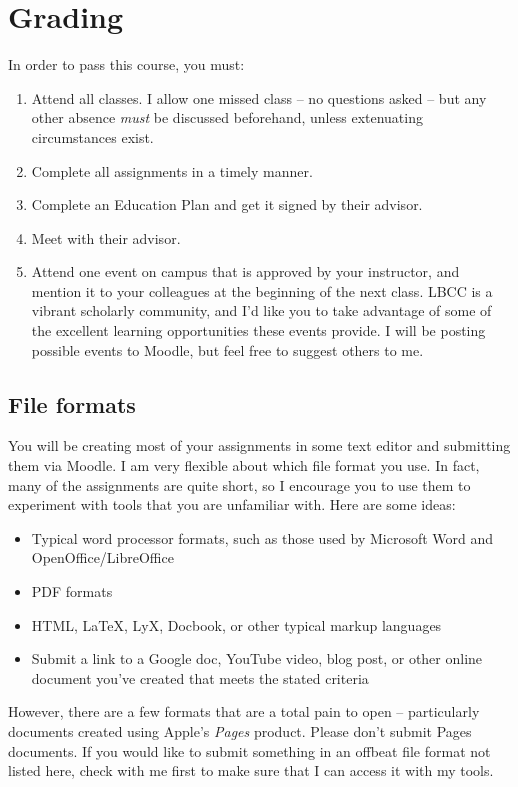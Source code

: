 \documentclass[12pt,article,oneside]{memoir}
\begin{document}
\section{Grading}

In order to pass this course, you must:

\begin{enumerate}
 \item Attend all classes.  I allow one missed class -- no questions asked -- but any other absence \emph{must} be discussed beforehand, unless extenuating circumstances exist.
 \item Complete all assignments in a timely manner.
 \item Complete an Education Plan and get it signed by their advisor.
 \item Meet with their advisor.
 \item Attend one event on campus that is approved by your instructor, and mention it to your colleagues at the beginning of the next class.  LBCC is a vibrant scholarly community, and I'd like you to take advantage of some of the excellent learning opportunities these events provide.  I will be posting possible events to Moodle, but feel free to suggest others to me.
\end{enumerate}

  
\subsection{File formats}
You will be creating most of your assignments in some text editor and submitting them via Moodle.  I am very flexible about which file format you use. In fact, many of the assignments are quite short, so I encourage you to use them to experiment with tools that you are unfamiliar with.  Here are some ideas:
\begin{itemize}
 \item Typical word processor formats, such as those used by Microsoft Word and OpenOffice/LibreOffice
 \item PDF formats
 \item HTML, \LaTeX, LyX,  Docbook, or other typical markup languages
 \item Submit a link to a Google doc, YouTube video, blog post, or other online document you've created that meets the stated criteria 
\end{itemize}



However, there are a few formats that are a total pain to open -- particularly documents created using Apple's \emph{Pages} product.  Please don't submit Pages documents. If you would like to submit something in an offbeat file format not listed here, check with me first to make sure that I can access it with my tools.
\end{document}
